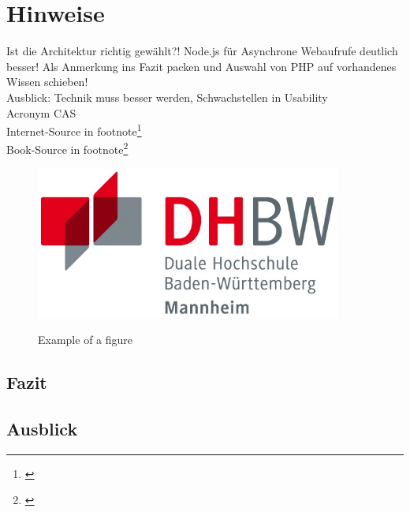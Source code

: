 \chapter{Hinweise}

Ist die Architektur richtig gewählt?! Node.js für Asynchrone Webaufrufe deutlich besser! Als Anmerkung ins Fazit packen und Auswahl von PHP auf vorhandenes Wissen  schieben!\\

Ausblick: Technik muss besser werden, Schwachstellen in Usability\\

Acronym \acf{CAS}\\

Internet-Source in footnote\footnote{\citep{cas}}\\

Book-Source in footnote\footnote{\citep{einfuehung_sap_hana}}\\

\begin{figure}[H]
	\centering
	{\includegraphics[height=5cm]{Bilder/logo_dhbw_ma.jpg}}
	\caption{Example of a figure \protect\citep[page 32]{cas}}
	\label{fig:Example}
\end{figure}


\section{Fazit}


\section{Ausblick}
